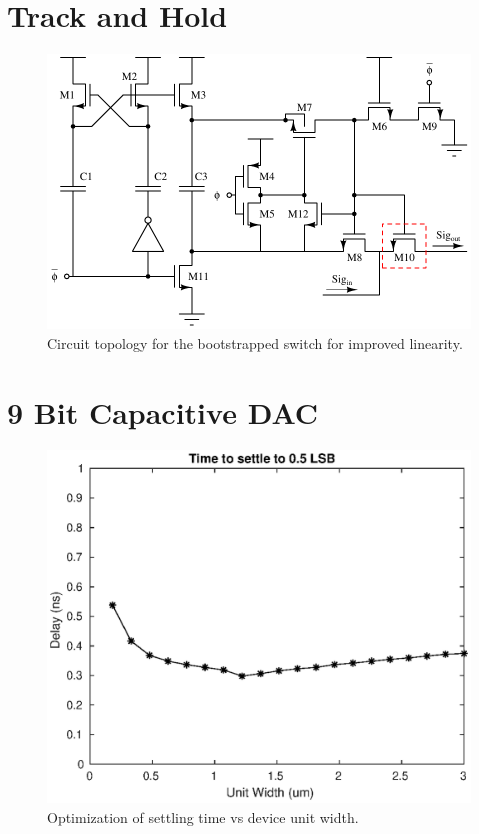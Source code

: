 \documentclass[10pt,journal]{IEEEtran}\usepackage{longtable}
\begin{document}


\section{Track and Hold}
\begin{figure}[tbph]
\begin{center}
\includegraphics[width=1\columnwidth]{BootstrappedSwitch.pdf}
\caption{Circuit topology for the bootstrapped switch for improved linearity.}
\label{fig:BootstrappedSwitch}
\end{center}
\end{figure}
\lipsum[1-4]



\section{9 Bit Capacitive DAC}

\begin{figure}[tbph]
\begin{center}
\includegraphics[width=1\columnwidth]{dac_optimization.eps}
\caption{Optimization of settling time vs device unit width.}
\label{fig:DacOptimization}
\end{center}
\end{figure}
\end{document}
